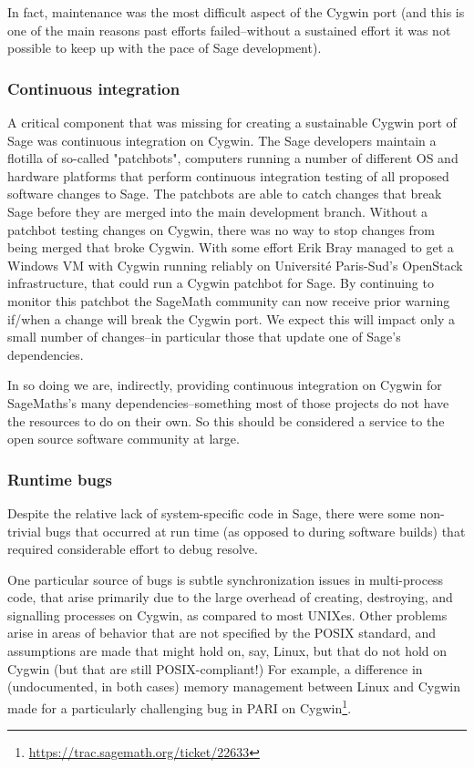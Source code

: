 In fact, maintenance was the most difficult aspect of the Cygwin port
(and this is one of the main reasons past efforts failed--without a
sustained effort it was not possible to keep up with the pace of Sage
development).

\hypertarget{continuous-integration}{%
\subsubsection{Continuous integration}\label{continuous-integration}}

A critical component that was missing for creating a sustainable Cygwin port of
Sage was continuous integration on Cygwin. The Sage developers maintain a
flotilla of so-called "patchbots", computers running a number of different OS
and hardware platforms that perform continuous integration testing of all
proposed software changes to Sage.  The patchbots are able to catch changes
that break Sage before they are merged into the main development branch.
Without a patchbot testing changes on Cygwin, there was no way to stop changes
from being merged that broke Cygwin. With some effort Erik Bray managed to get
a Windows VM with Cygwin running reliably on Université Paris-Sud's OpenStack
infrastructure, that could run a Cygwin patchbot for Sage. By continuing to
monitor this patchbot the SageMath community can now receive prior warning
if/when a change will break the Cygwin port. We expect this will impact only a
small number of changes--in particular those that update one of Sage's
dependencies.

In so doing we are, indirectly, providing continuous integration on
Cygwin for SageMaths's many dependencies--something most of those
projects do not have the resources to do on their own. So this should be
considered a service to the open source software community at large.


\hypertarget{runtime-bugs}{%
\subsubsection{Runtime bugs}\label{runtime-bugs}}

Despite the relative lack of system-specific code in Sage, there were some
non-trivial bugs that occurred at run time (as opposed to during software
builds) that required considerable effort to debug resolve.

One particular source of bugs is subtle synchronization issues in multi-process
code, that arise primarily due to the large overhead of creating, destroying,
and signalling processes on Cygwin, as compared to most UNIXes.  Other problems
arise in areas of behavior that are not specified by the POSIX standard, and
assumptions are made that might hold on, say, Linux, but that do not hold on
Cygwin (but that are still POSIX-compliant!)  For example, a difference in
(undocumented, in both cases) memory management between Linux and Cygwin made
for a particularly challenging bug in PARI on
Cygwin\footnote{\url{https://trac.sagemath.org/ticket/22633}}.


